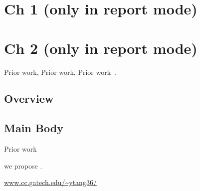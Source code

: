 \tableofcontents
\newpage

\ifdefined\TTSTYLETARGETreport
\chapter{Ch 1 (only in report mode)}
\chapter{Ch 2 (only in report mode)}
\fi

Prior work, Prior work, Prior work~.


\section{Overview} \label{sec:overview}
\section{Main Body} \label{sec:mainbody}
Prior work~\cite{DBLP:books/crc/KatzLindell2007}

we propose {\ssssp}.

\url{www.cc.gatech.edu/~ytang36/}

\newpage
\newpage

